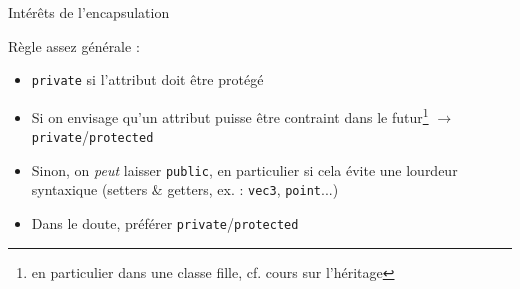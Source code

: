 \documentclass[c]{beamer}
\newcommand{\inline}[1]{\texttt{#1}}
\begin{document}

\begin{frame}[fragile]{Intérêts de l'encapsulation}

Règle assez générale :
\begin{itemize}[<+->]
\item \inline{private} si l'attribut doit être protégé
\item Si on envisage qu'un attribut puisse être contraint dans le futur\footnote{en particulier dans une classe fille, cf. cours sur l'héritage} $\rightarrow$ \inline{private}/\inline{protected}
\item Sinon, on \emph{peut} laisser \inline{public}, en particulier si cela évite une lourdeur syntaxique (setters \& getters, ex. : \texttt{vec3}, \texttt{point}...)
\item Dans le doute, préférer \inline{private}/\inline{protected}
\end{itemize}

\end{frame}
\end{document}
